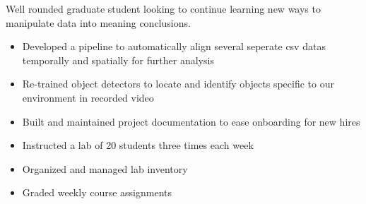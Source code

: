 \documentclass[10pt,letterpaper,ragged2e]{altacv}
\begin{document}
\tagline{}

\begin{fullwidth}
\makecvheader

Well rounded graduate student looking to continue learning new ways to manipulate data into meaning conclusions.

\end{fullwidth}




\begin{itemize}
  \item Developed a pipeline to automatically align several seperate csv datas temporally and spatially for further analysis
  \item Re-trained object detectors to locate and identify objects specific to our environment in recorded video
  \item Built and maintained project documentation to ease onboarding for new hires
\end{itemize}

\divider

\begin{itemize}
  \item Instructed a lab of 20 students three times each week
  \item Organized and managed lab inventory
  \item Graded weekly course assignments
\end{itemize}
\end{document}
